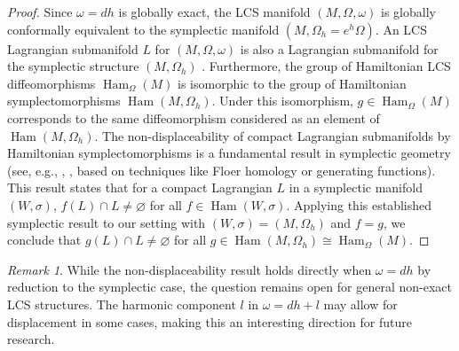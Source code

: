 \documentclass[11pt,a4paper]{amsart}
\theoremstyle{definition}
\theoremstyle{remark}
\newtheorem{remark}[theorem]{Remark}
\newcommand{\Ham}{\operatorname{Ham}}
\begin{document}
	\begin{proof}
		Since $\omega = dh$ is globally exact, the LCS manifold $(M, \Omega, \omega)$ is globally conformally equivalent to the symplectic manifold $(M, \Omega_h = e^h\Omega)$. An LCS Lagrangian submanifold $L$ for $(M, \Omega, \omega)$ is also a Lagrangian submanifold for the symplectic structure $(M, \Omega_h)$ \cite{Weinstein1971}. Furthermore, the group of Hamiltonian LCS diffeomorphisms $\Ham_\Omega(M)$ is isomorphic to the group of Hamiltonian symplectomorphisms $\Ham(M, \Omega_h)$. Under this isomorphism, $g \in \Ham_\Omega(M)$ corresponds to the same diffeomorphism considered as an element of $\Ham(M, \Omega_h)$. The non-displaceability of compact Lagrangian submanifolds by Hamiltonian symplectomorphisms is a fundamental result in symplectic geometry (see, e.g., \cite{Weinstein1971}, \cite{McDuffSalamon2017}, based on techniques like Floer homology or generating functions). This result states that for a compact Lagrangian $L$ in a symplectic manifold $(W, \sigma)$, $f(L) \cap L \neq \varnothing$ for all $f \in \Ham(W, \sigma)$. Applying this established symplectic result to our setting with $(W, \sigma) = (M, \Omega_h)$ and $f = g$, we conclude that $g(L) \cap L \neq \varnothing$ for all $g \in \Ham(M, \Omega_h) \cong \Ham_\Omega(M)$.
	\end{proof}
	
	\begin{remark}
		While the non-displaceability result holds directly when $\omega = dh$ by reduction to the symplectic case, the question remains open for general non-exact LCS structures. The harmonic component $l$ in $\omega = dh + l$ may allow for displacement in some cases, making this an interesting direction for future research.
	\end{remark}
	
\end{document}
